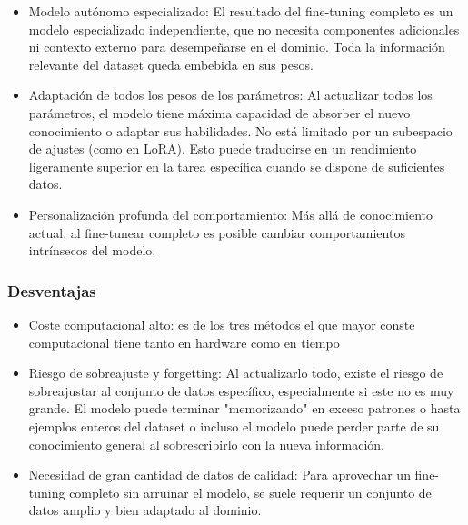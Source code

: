 \begin{itemize}
    \item Modelo autónomo especializado: El resultado del fine-tuning completo es un modelo especializado independiente, que no necesita componentes adicionales ni contexto externo para desempeñarse en el dominio. Toda la información relevante del dataset queda embebida en sus pesos.

    \item Adaptación de todos los pesos de los parámetros: Al actualizar todos los parámetros, el modelo tiene máxima capacidad de absorber el nuevo conocimiento o adaptar sus habilidades. No está limitado por un subespacio de ajustes (como en LoRA). Esto puede traducirse en un rendimiento ligeramente superior en la tarea específica cuando se dispone de suficientes datos.

    \item Personalización profunda del comportamiento: Más allá de conocimiento actual, al fine-tunear completo es posible cambiar comportamientos intrínsecos del modelo.
\end{itemize}

\subsubsection{Desventajas}
\begin{itemize}

    \item Coste computacional alto: es de los tres métodos el que mayor conste computacional tiene tanto en hardware como en tiempo

    \item Riesgo de sobreajuste y forgetting: Al actualizarlo todo, existe el riesgo de sobreajustar al conjunto de datos específico, especialmente si este no es muy grande. El modelo puede terminar "memorizando" en exceso patrones o hasta ejemplos enteros del dataset o incluso el  modelo puede perder parte de su conocimiento general al sobrescribirlo con la nueva información.

    \item Necesidad de gran cantidad de datos de calidad: Para aprovechar un fine-tuning completo sin arruinar el modelo, se suele requerir un conjunto de datos amplio y bien adaptado al dominio.
\end{itemize}

